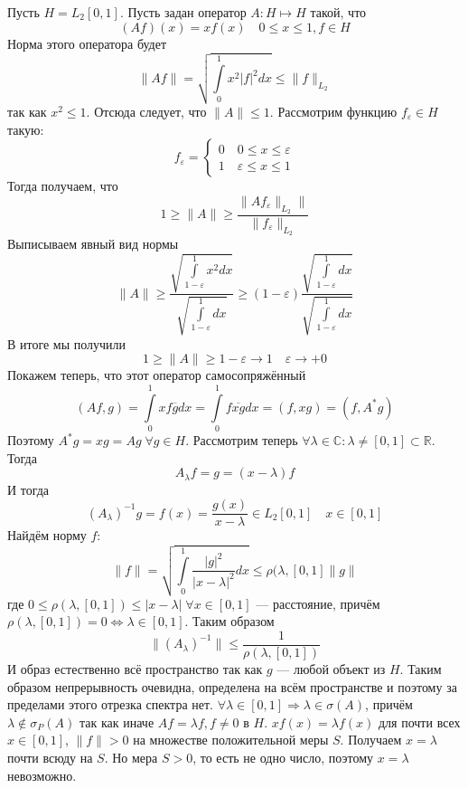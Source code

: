 \documentclass[12pt]{article}
\newcommand{\Al}{A_\lambda}
\newcommand{\Alo}{(\Al)^{-1}}
\begin{document}
\nopagebreak
\begin{Prim}
    Пусть $H = L_2[0,1]$.
    Пусть задан оператор $A : H \mapsto H$ такой, что
    $$
    (A f)(x) = x f(x) \quad 0 \le x \le 1, f \in H
    $$
    Норма этого оператора будет
    $$
    \|Af\| = \sqrt{\int\limits_0^1 x^2 |f|^2 dx} \le \|f\|_{L_2}
    $$
    так как $x^2 \le 1$.
    Отсюда следует, что $\|A\| \le 1$.
    Рассмотрим функцию $f_\varepsilon \in H$ такую:
    $$
    f_\varepsilon =
    \left\{
        \begin{aligned}
            0 \quad 0 \le x \le \varepsilon\\
            1 \quad \varepsilon \le x \le 1
        \end{aligned}
    \right.
    $$
    Тогда получаем, что
    $$
    1 \ge \|A\| \ge \frac{\|A f_\varepsilon\|_{L_2}\|}{\|f_\varepsilon\|
    _{L_2}}
    $$
    Выписываем явный вид нормы
    $$
    \|A\| \ge \frac{\sqrt{\int\limits_{1 - \varepsilon}^1 x^2 dx}}{\sqrt{\int
    \limits_{1-\varepsilon}^1 dx}} \ge (1  - \varepsilon)
    \frac{\sqrt{\int\limits_{1 - \varepsilon}^1 dx}}{\sqrt{\int\limits_{1 - 
    \varepsilon}^1 dx}}
    $$
    В итоге мы получили
    $$
    1 \ge \|A\| \ge 1 - \varepsilon \to 1 \quad \varepsilon \to +0
    $$
    Покажем теперь, что этот оператор самосопряжённый
    $$
    (Af, g) = \int\limits_0^1 x f \overline{g} dx = \int \limits_0^1 f 
    \overline{xg} dx = (f, xg) = (f, A^*g)
    $$
    Поэтому $A^*g = xg =Ag\; \forall g \in H$.
    Рассмотрим теперь $\forall \lambda \in \mathbb C\colon \lambda \ne [0,1] 
    \subset \mathbb R$.
    Тогда
    $$
    \Al f = g = (x - \lambda)f
    $$
    И тогда
    $$
    \Alo g = f(x) = \frac{g(x)}{x -\lambda} \in L_2[0,1] \quad x \in [0,1]
    $$
    Найдём норму $f$:
    $$
    \|f\| = \sqrt{\int \limits_0^1 \frac{|g|^2}{|x - \lambda|^2}dx} \le 
    \rho(\lambda, [0,1] \|g\|
    $$
    где $0 \le \rho(\lambda, [0, 1]) \le |x - \lambda|\; \forall x \in [0, 1]$ 
    --- расстояние, причём $\rho(\lambda, [0, 1]) = 0 
    \Leftrightarrow \lambda \in [0,1]$.
    Таким образом 
    $$
    \|\Alo\| \le \frac{1}{\rho(\lambda, [0, 1])}
    $$
    И образ естественно всё пространство так как $g$ --- любой объект из $H$.
    Таким образом непрерывность очевидна, определена на всём пространстве и 
    поэтому за пределами этого отрезка спектра
    нет.
    $\forall \lambda \in [0,1] \Rightarrow \lambda \in \sigma(A)$, причём $
    \lambda \notin \sigma_P(A)$ так как иначе
    $Af = \lambda f, f \ne 0$ в $H$.
    $x f(x) = \lambda f(x)$ для почти всех $x \in [0,1]$, $\|f\| > 0$ на 
    множестве положительной меры $S$. 
    Получаем $x = \lambda$ почти всюду на $S$.
    Но мера $S > 0$, то есть не одно число, поэтому $x = \lambda$ невозможно.
    

\end{Prim}
\end{document}
